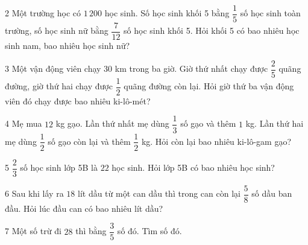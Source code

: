 \gap
\begin{probbox}{2}{\relax}
Một trường học có $1\,200$ học sinh. Số học sinh khối 5 bằng $\dfrac15$ số học sinh toàn trường, số học sinh nữ bằng $\dfrac7{12}$ số học sinh khối 5. Hỏi khối 5 có bao nhiêu học sinh nam, bao nhiêu học sinh nữ?
\end{probbox}
\gap
\begin{probbox}{3}{\relax}
Một vận động viên chạy $30$ km trong ba giờ. Giờ thứ nhất chạy được $\dfrac25$ quãng đường, giờ thứ hai chạy được $\dfrac12$ quãng đường còn lại. Hỏi giờ thứ ba vận động viên đó chạy được bao nhiêu ki-lô-mét?
\end{probbox}
\gap
\begin{probbox}{4}{\relax}
Mẹ mua $12$ kg gạo. Lần thứ nhất mẹ dùng $\dfrac13$ số gạo và thêm $1$ kg. Lần thứ hai mẹ dùng $\dfrac12$ số gạo còn lại và thêm $\dfrac12$ kg. Hỏi còn lại bao nhiêu ki-lô-gam gạo?
\end{probbox}
\gap
\begin{probbox}{5}{\relax}
$\dfrac23$ số học sinh lớp 5B là $22$ học sinh. Hỏi lớp 5B có bao nhiêu học sinh?
\end{probbox}
\gap
\begin{probbox}{6}{\relax}
Sau khi lấy ra $18$ lít dầu từ một can dầu thì trong can còn lại $\dfrac58$ số dầu ban đầu. Hỏi lúc đầu can có bao nhiêu lít dầu?
\end{probbox}
\gap
\begin{probbox}{7}{\relax}
Một số trừ đi $28$ thì bằng $\dfrac35$ số đó. Tìm số đó.
\end{probbox}
